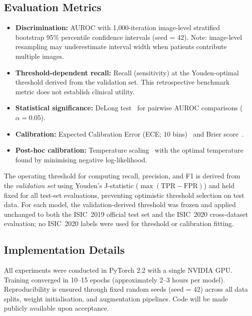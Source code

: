 \documentclass[12pt, a4paper]{article}
\begin{document}
\subsection{Evaluation Metrics}

\begin{itemize}
    \item \textbf{Discrimination:} AUROC with 1{,}000-iteration image-level stratified bootstrap 95\% percentile confidence intervals (seed = 42). Note: image-level resampling may underestimate interval width when patients contribute multiple images.
    \item \textbf{Threshold-dependent recall:} Recall (sensitivity) at the Youden-optimal threshold derived from the validation set. This retrospective benchmark metric does not establish clinical utility.
    \item \textbf{Statistical significance:} DeLong test~\citep{delong1988comparing} for pairwise AUROC comparisons ($\alpha = 0.05$).
    \item \textbf{Calibration:} Expected Calibration Error (ECE; 10 bins)~\citep{naeini2015obtaining} and Brier score~\citep{brier1950verification}.
    \item \textbf{Post-hoc calibration:} Temperature scaling~\citep{guo2017calibration} with the optimal temperature found by minimising negative log-likelihood.
\end{itemize}

The operating threshold for computing recall, precision, and F1 is derived from the \emph{validation set} using Youden's J-statistic ($\max(\text{TPR} - \text{FPR})$) and held fixed for all test-set evaluations, preventing optimistic threshold selection on test data. For each model, the validation-derived threshold was frozen and applied unchanged to both the ISIC~2019 official test set and the ISIC~2020 cross-dataset evaluation; no ISIC~2020 labels were used for threshold or calibration fitting.

\subsection{Implementation Details}

All experiments were conducted in PyTorch 2.2 with a single NVIDIA GPU. Training converged in 10--15 epochs (approximately 2--3 hours per model). Reproducibility is ensured through fixed random seeds (seed = 42) across all data splits, weight initialisation, and augmentation pipelines. Code will be made publicly available upon acceptance.
\end{document}
